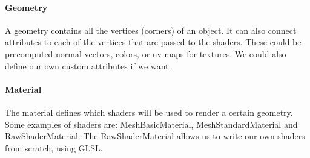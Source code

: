 \hypertarget{geometry}{%
\paragraph{Geometry}\label{geometry}}

A geometry contains all the vertices (corners) of an object. It can also
connect attributes to each of the vertices that are passed to the
shaders. These could be precomputed normal vectors, colors, or uv-maps
for textures. We could also define our own custom attributes if we want.

\begin{Shaded}
\begin{Highlighting}[]
 \OperatorTok{*}  
\OperatorTok{=} 
\OperatorTok{=} 
\OperatorTok{=}  \OperatorTok{,}\OperatorTok{,}
\end{Highlighting}
\end{Shaded}

\hypertarget{material}{%
\paragraph{Material}\label{material}}

The material defines which shaders will be used to render a certain
geometry. Some examples of shaders are: MeshBasicMaterial,
MeshStandardMaterial and RawShaderMaterial. The RawShaderMaterial allows
us to write our own shaders from scratch, using GLSL.

